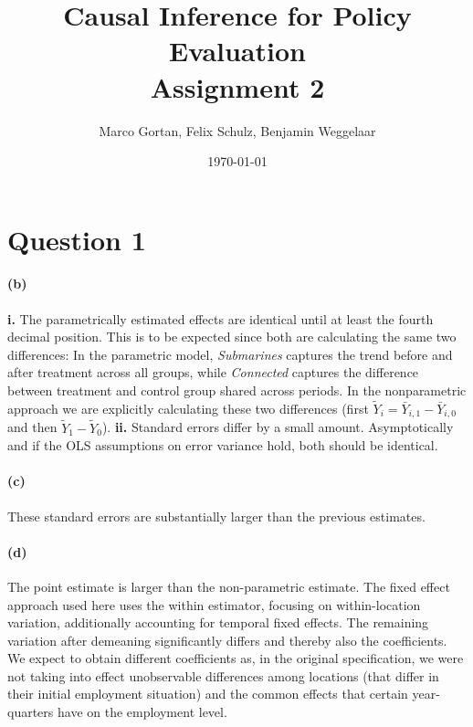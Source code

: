 \documentclass{scrartcl}
\title{Causal Inference for Policy Evaluation\\
\Large{Assignment 2}}
\author{Marco Gortan, Felix Schulz, Benjamin Weggelaar}
\date{\today}
\begin{document}
\maketitle

\section*{Question 1}



\paragraph*{(b)}

\textbf{i.} The parametrically estimated effects are identical until at least the fourth decimal position. This is to be expected since both are calculating the same two differences: In the parametric model, \textit{Submarines} captures the trend before and after treatment across all groups, while \textit{Connected} captures the difference between treatment and control group shared across periods. In the nonparametric approach we are explicitly calculating these two differences (first $\tilde{Y}_i = \bar{Y}_{i,1} - \bar{Y}_{i,0}$ and then $\tilde{Y}_1 - \tilde{Y}_0$).
\textbf{ii.} Standard errors differ by a small amount. Asymptotically and if the OLS assumptions on error variance hold, both should be identical.




\paragraph*{(c)} These standard errors are substantially larger than the previous estimates.

\paragraph*{(d)} The point estimate is larger than the non-parametric estimate. The fixed effect approach used here uses the within estimator, focusing on within-location variation, additionally accounting for temporal fixed effects. The remaining variation after demeaning significantly differs and thereby also the coefficients. We expect to obtain different coefficients as, in the original specification, we were not taking into effect unobservable differences among locations (that differ in their initial employment situation) and the common effects that certain year-quarters have on the employment level.  
\end{document}
